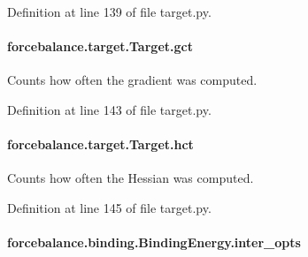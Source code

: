 Definition at line 139 of file target.\-py.

\hypertarget{classforcebalance_1_1target_1_1Target_aa625ac88c6744eb14ef281d9496d0dbb}{
\paragraph[{gct}]{\setlength{\rightskip}{0pt plus 5cm}forcebalance.\-target.\-Target.\-gct\hspace{0.3cm}{\ttfamily [inherited]}}}\label{classforcebalance_1_1target_1_1Target_aa625ac88c6744eb14ef281d9496d0dbb}


Counts how often the gradient was computed. 



Definition at line 143 of file target.\-py.

\hypertarget{classforcebalance_1_1target_1_1Target_a5b5a42f78052b47f29ed4b940c6111a1}{
\paragraph[{hct}]{\setlength{\rightskip}{0pt plus 5cm}forcebalance.\-target.\-Target.\-hct\hspace{0.3cm}{\ttfamily [inherited]}}}\label{classforcebalance_1_1target_1_1Target_a5b5a42f78052b47f29ed4b940c6111a1}


Counts how often the Hessian was computed. 



Definition at line 145 of file target.\-py.

\hypertarget{classforcebalance_1_1binding_1_1BindingEnergy_a9d1f28fc62222da17c0fd12593042f10}{
\paragraph[{inter\-\_\-opts}]{\setlength{\rightskip}{0pt plus 5cm}forcebalance.\-binding.\-Binding\-Energy.\-inter\-\_\-opts}}\label{classforcebalance_1_1binding_1_1BindingEnergy_a9d1f28fc62222da17c0fd12593042f10}


